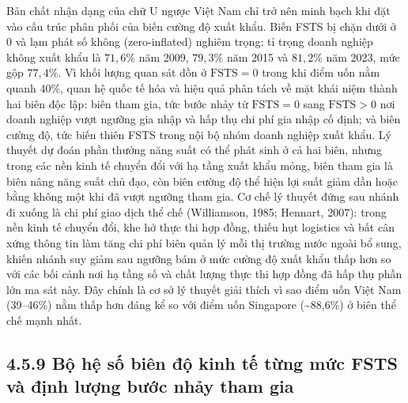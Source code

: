\documentclass[
  a4paper,
  13pt]{extreport}
\begin{document}
Bản chất nhận dạng của chữ U ngược Việt Nam chỉ trở nên minh bạch khi
đặt vào cấu trúc phân phối của biến cường độ xuất khẩu. Biến FSTS bị
chặn dưới ở 0 và lạm phát số không (zero-inflated) nghiêm trọng: tỉ
trọng doanh nghiệp không xuất khẩu là \(71{,}6\%\) năm 2009,
\(79{,}3\%\) năm 2015 và \(81{,}2\%\) năm 2023, mức gộp \(77{,}4\%\). Vì
khối lượng quan sát dồn ở \(\mathrm{FSTS} = 0\) trong khi điểm uốn nằm
quanh 40\%, quan hệ quốc tế hóa và hiệu quả phân tách về mặt khái niệm
thành hai biên độc lập: biên tham gia, tức bước nhảy từ
\(\mathrm{FSTS} = 0\) sang \(\mathrm{FSTS} > 0\) nơi doanh nghiệp vượt
ngưỡng gia nhập và hấp thụ chi phí gia nhập cố định; và biên cường độ,
tức biến thiên FSTS trong nội bộ nhóm doanh nghiệp xuất khẩu. Lý thuyết
dự đoán phần thưởng năng suất có thể phát sinh ở cả hai biên, nhưng
trong các nền kinh tế chuyển đổi với hạ tầng xuất khẩu mỏng, biên tham
gia là biên nâng năng suất chủ đạo, còn biên cường độ thể hiện lợi suất
giảm dần hoặc bằng không một khi đã vượt ngưỡng tham gia. Cơ chế lý
thuyết đứng sau nhánh đi xuống là chi phí giao dịch thể chế (Williamson,
1985; Hennart, 2007): trong nền kinh tế chuyển đổi, khe hở thực thi hợp
đồng, thiếu hụt logistics và bất cân xứng thông tin làm tăng chi phí
biên quản lý mỗi thị trường nước ngoài bổ sung, khiến nhánh suy giảm sau
ngưỡng bám ở mức cường độ xuất khẩu thấp hơn so với các bối cảnh nơi hạ
tầng số và chất lượng thực thi hợp đồng đã hấp thụ phần lớn ma sát này.
Đây chính là cơ sở lý thuyết giải thích vì sao điểm uốn Việt Nam
(39--46\%) nằm thấp hơn đáng kể so với điểm uốn Singapore
(\textasciitilde88,6\%) ở biên thể chế mạnh nhất.

\hypertarget{bux1ed9-hux1ec7-sux1ed1-biuxean-ux111ux1ed9-kinh-tux1ebf-tux1eebng-mux1ee9c-fsts-vuxe0-ux111ux1ecbnh-lux1b0ux1ee3ng-bux1b0ux1edbc-nhux1ea3y-tham-gia}{%
\subsection{4.5.9 Bộ hệ số biên độ kinh tế từng mức FSTS và định lượng
bước nhảy tham
gia}\label{bux1ed9-hux1ec7-sux1ed1-biuxean-ux111ux1ed9-kinh-tux1ebf-tux1eebng-mux1ee9c-fsts-vuxe0-ux111ux1ecbnh-lux1b0ux1ee3ng-bux1b0ux1edbc-nhux1ea3y-tham-gia}}
\end{document}

